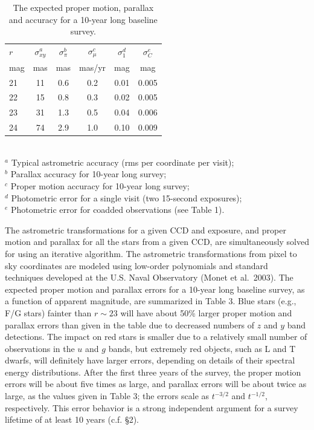 \begin{table}[b!]
\caption{The expected proper motion, parallax and accuracy for a 10-year long baseline survey.}
\begin{tabular}{|l|c|c|c|c|c|}
\hline
    $r$   &  $\sigma^a_{xy} $  & $\sigma^b_\pi$  &   $\sigma^c_\mu$   &  $\sigma^d_1$  &  $\sigma^e_C$  \\
    mag &       mas            &      mas  & mas/yr &   mag   &    mag  \\
\hline
       21 &  11  &  0.6  &  0.2   &   0.01  &   0.005 \\
       22 &  15  &  0.8  &  0.3   &   0.02  &   0.005 \\
       23 &  31  &  1.3  &  0.5   &   0.04  &   0.006 \\
       24 &  74  &  2.9  &  1.0   &   0.10  &   0.009 \\
\hline
\end{tabular}
\\ \vskip 0.05in
  $^a$ Typical astrometric accuracy (rms per coordinate per visit); \\
  $^b$ Parallax accuracy for 10-year long survey; \\
  $^c$ Proper motion accuracy for 10-year long survey; \\
  $^d$ Photometric error for a single visit (two 15-second exposures); \\
  $^e$ Photometric error for coadded observations (see Table 1). \\
\end{table}


The astrometric transformations for a given CCD and exposure, and
proper motion and parallax for all the stars from a given CCD, are simultaneously
solved for using an iterative algorithm. The astrometric transformations from
pixel to sky coordinates are modeled using low-order polynomials and standard
techniques developed at the U.S. Naval Observatory (Monet et al.~2003). The expected
proper motion and
parallax errors for a 10-year long baseline survey, as a function of apparent
magnitude, are summarized in Table 3. Blue stars (e.g., F/G stars) fainter than
$r\sim23$ will have about 50\% larger proper motion and parallax errors than
given in the table due to decreased numbers of $z$ and $y$ band detections. The
impact on red stars is smaller due to a relatively small number of observations
in the $u$ and $g$ bands, but extremely red objects, such as L and T dwarfs,
will definitely have larger errors, depending on details of their spectral
energy distributions.  After the first three years of the survey,
{the proper motion errors will be about five times as large, and parallax
errors will be about twice as large,} as the values given in Table 3; the errors
scale as $t^{-3/2}$ and $t^{-1/2}$, respectively. This error behavior is
a strong independent argument for a survey lifetime of at least 10 years
(c.f. \S 2).





